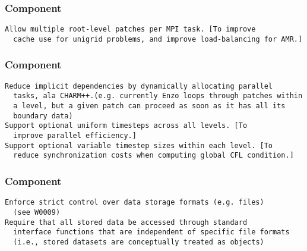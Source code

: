 \documentclass[14pt,letter]{article}
\begin{document}
\subsubsection{ Component} \label{sss:array-component}

\begin{verbatim}
Allow multiple root-level patches per MPI task. [To improve
  cache use for unigrid problems, and improve load-balancing for AMR.]
\end{verbatim}

\subsubsection{ Component} \label{sss:control-component}

\begin{verbatim}
Reduce implicit dependencies by dynamically allocating parallel
  tasks, ala CHARM++.(e.g. currently Enzo loops through patches within
  a level, but a given patch can proceed as soon as it has all its
  boundary data)
Support optional uniform timesteps across all levels. [To
  improve parallel efficiency.]
Support optional variable timestep sizes within each level. [To
  reduce synchronization costs when computing global CFL condition.]
\end{verbatim}

\subsubsection{ Component}  \label{sss:storage-component}

\begin{verbatim}
Enforce strict control over data storage formats (e.g. files)
  (see W0009)
Require that all stored data be accessed through standard
  interface functions that are independent of specific file formats
  (i.e., stored datasets are conceptually treated as objects)
\end{verbatim}

\end{document}
